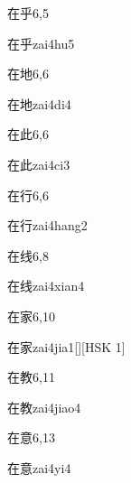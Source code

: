 \begin{entry}{在乎}{6,5}
  \begin{phonetics}{在乎}{zai4hu5}
  \end{phonetics}
\end{entry}

\begin{entry}{在地}{6,6}
  \begin{phonetics}{在地}{zai4di4}
  \end{phonetics}
\end{entry}

\begin{entry}{在此}{6,6}
  \begin{phonetics}{在此}{zai4ci3}
  \end{phonetics}
\end{entry}

\begin{entry}{在行}{6,6}
  \begin{phonetics}{在行}{zai4hang2}
  \end{phonetics}
\end{entry}

\begin{entry}{在线}{6,8}
  \begin{phonetics}{在线}{zai4xian4}
  \end{phonetics}
\end{entry}

\begin{entry}{在家}{6,10}
  \begin{phonetics}{在家}{zai4jia1}[][HSK 1]
  \end{phonetics}
\end{entry}

\begin{entry}{在教}{6,11}
  \begin{phonetics}{在教}{zai4jiao4}
  \end{phonetics}
\end{entry}

\begin{entry}{在意}{6,13}
  \begin{phonetics}{在意}{zai4yi4}
  \end{phonetics}
\end{entry}


